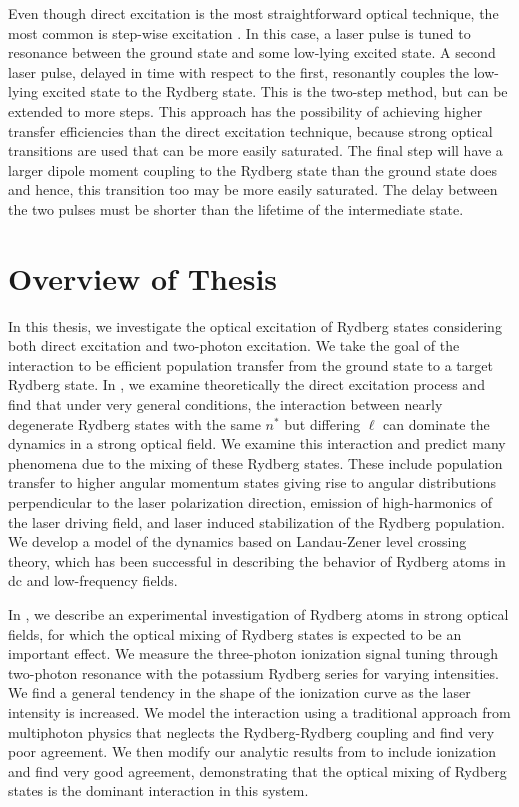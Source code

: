 Even though direct excitation is the most straightforward optical technique,
the most common is step-wise excitation \cite{Fabre:75,Zimmerman:79}. 
In this case, a laser pulse is tuned to resonance between the ground state
and some low-lying excited state.  A second laser pulse, delayed in time
with respect to the first, resonantly couples the low-lying excited state to
the Rydberg state.  This is the two-step method, but can be extended
to more steps.  This approach has the possibility of achieving higher transfer
efficiencies than the direct excitation technique, because strong optical
transitions are used that can be more easily saturated.  The final step will
have a larger dipole moment coupling to the Rydberg state than the ground state
does and hence, this transition too may be more easily saturated.  The delay
between the two pulses must be shorter than the lifetime of the intermediate
state.

\section{Overview of Thesis}
\hspace{\parindent} In this thesis, we investigate the optical excitation of
Rydberg states considering both direct excitation and two-photon excitation.
We take the goal of the interaction to be efficient population transfer from
the ground state to a target Rydberg state.  In , we examine
theoretically the direct excitation process and find that under very general
conditions, the interaction between nearly degenerate Rydberg states with the
same $n^*$ but differing $\ell$ can dominate the dynamics in a strong optical
field.  We examine this interaction and predict many phenomena due to the
mixing of these Rydberg states.  These include population transfer to higher
angular momentum states giving rise to angular distributions perpendicular to
the laser polarization direction, emission of high-harmonics of the laser
driving field, and laser induced stabilization of the Rydberg population.  We
develop a model of the dynamics based on Landau-Zener level crossing theory,
which has been successful in describing the behavior of Rydberg atoms in dc
and low-frequency fields.

In , we describe an experimental investigation of Rydberg atoms
in strong optical fields, for which the optical mixing of Rydberg states is
expected to be an important effect.  We measure the three-photon ionization
signal tuning through two-photon resonance with the potassium Rydberg series
for varying intensities.  We find a general tendency in the shape of the
ionization curve as the laser intensity is increased.  We model the interaction
using a traditional approach from multiphoton physics that neglects the
Rydberg-Rydberg coupling and find very poor agreement.  We then modify our
analytic results from  to include ionization and find very
good agreement, demonstrating that the optical mixing of Rydberg states is the
dominant interaction in this system.


